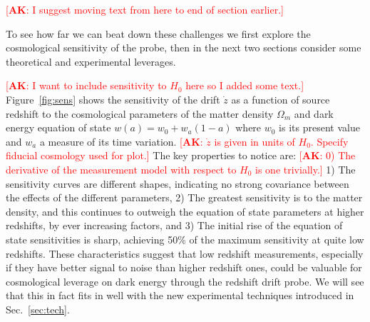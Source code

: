 \documentclass[preprint2, 10pt]{aastex}
\newcommand{\alex}[1]{\textcolor{red}{[{\bf AK}: #1]}}
\newcommand{\om}{\Omega_m}
\begin{document}
\alex{I suggest moving text from here to end of section earlier.}

To see how far we can beat down these challenges we first explore the 
cosmological sensitivity of the probe, then in the next two sections 
consider some theoretical and experimental leverages. 

\alex{I want to include sensitivity to $H_0$ here so I added some text.}
Figure~\ref{fig:sens} shows the sensitivity of the drift $\dot z$ as a 
function of source redshift to the cosmological parameters of the matter 
density $\om$ and dark energy equation of state $w(a)=w_0+w_a(1-a)$ where 
$w_0$ is its present value and $w_a$ a measure of its time variation.
\alex{$\dot{z}$ is given
in units of $H_0$.  Specify fiducial cosmology used for plot.}
The 
key properties to notice are: 
\alex{0) The derivative of the measurement model with
respect to $H_0$
is one trivially.}
1) The sensitivity curves are different 
shapes, indicating no strong covariance between the effects of the different 
parameters, 2) The greatest sensitivity is to the matter density, and this 
continues to outweigh the equation of state parameters at higher redshifts, 
by ever increasing factors, and 3) The initial rise of the equation of 
state sensitivities is sharp, achieving 50\% of the maximum sensitivity 
at quite low redshifts. These characteristics suggest that low redshift 
measurements, especially if they have better signal to noise than higher 
redshift ones, could be valuable for cosmological leverage on dark energy 
through the redshift drift probe. We will see that this in fact fits in 
well with the new experimental techniques introduced in Sec.~\ref{sec:tech}. 
\end{document}
